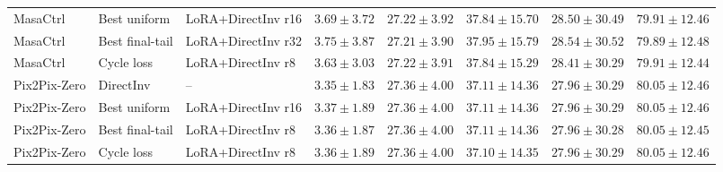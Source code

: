 \documentclass[11pt]{article}
\begin{document}
\begin{table}[htbp]
{\begin{tabular}{lll rrrrr}
    MasaCtrl & Best uniform & LoRA+DirectInv r16 & $3.69 \pm 3.72$ & $27.22 \pm 3.92$ & $37.84 \pm 15.70$ & $28.50 \pm 30.49$ & $79.91 \pm 12.46$ \tabularnewline
    MasaCtrl & Best final-tail & LoRA+DirectInv r32 & $3.75 \pm 3.87$ & $27.21 \pm 3.90$ & $37.95 \pm 15.79$ & $28.54 \pm 30.52$ & $79.89 \pm 12.48$ \tabularnewline
    MasaCtrl & Cycle loss & LoRA+DirectInv r8 & $3.63 \pm 3.03$ & $27.22 \pm 3.91$ & $37.84 \pm 15.29$ & $28.41 \pm 30.29$ & $79.91 \pm 12.44$ \tabularnewline
    \midrule
    Pix2Pix-Zero & DirectInv & -- & $\mathbf{3.35 \pm 1.83}$ & $\mathbf{27.36 \pm 4.00}$ & $37.11 \pm 14.36$ & $\mathbf{27.96 \pm 30.29}$ & $\mathbf{80.05 \pm 12.46}$ \tabularnewline
    Pix2Pix-Zero & Best uniform & LoRA+DirectInv r16 & $3.37 \pm 1.89$ & $27.36 \pm 4.00$ & $\mathbf{37.11 \pm 14.36}$ & $27.96 \pm 30.29$ & $80.05 \pm 12.46$ \tabularnewline
    Pix2Pix-Zero & Best final-tail & LoRA+DirectInv r8 & $3.36 \pm 1.87$ & $27.36 \pm 4.00$ & $37.11 \pm 14.36$ & $27.96 \pm 30.28$ & $80.05 \pm 12.45$ \tabularnewline
    Pix2Pix-Zero & Cycle loss & LoRA+DirectInv r8 & $3.36 \pm 1.89$ & $27.36 \pm 4.00$ & $\mathbf{37.10 \pm 14.35}$ & $27.96 \pm 30.29$ & $\mathbf{80.05 \pm 12.46}$ \tabularnewline
    \bottomrule
  \end{tabular}
  }
\end{table}
\end{document}

